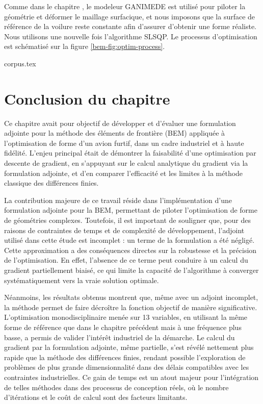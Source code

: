 Comme dans le chapitre \textit{}, le modeleur GANIMEDE \citep{Kleinveld2008} est utilisé pour piloter la géométrie et déformer le maillage surfacique, et nous imposons que la surface de référence de la voilure reste constante afin d'assurer d'obtenir une forme réaliste. Nous utilisons une nouvelle fois l'algorithme SLSQP. Le processus d'optimisation est schématisé sur la figure \ref{bem-fig:optim-process}.



\begin{article}
    {corpus.tex}
\end{article}

\section*{Conclusion du chapitre}
\label{sec:ch3-conclgen}

Ce chapitre avait pour objectif de développer et d'évaluer une formulation adjointe pour la méthode des éléments de frontière (BEM) appliquée à l'optimisation de forme d'un avion furtif, dans un cadre industriel et à haute fidélité. L'enjeu principal était de démontrer la faisabilité d'une optimisation par descente de gradient, en s'appuyant sur le calcul analytique du gradient via la formulation adjointe, et d'en comparer l'efficacité et les limites à la méthode classique des différences finies.

La contribution majeure de ce travail réside dans l'implémentation d'une formulation adjointe pour la BEM, permettant de piloter l'optimisation de forme de géométries complexes. Toutefois, il est important de souligner que, pour des raisons de contraintes de temps et de complexité de développement, l'adjoint utilisé dans cette étude est incomplet : un terme de la formulation a été négligé. Cette approximation a des conséquences directes sur la robustesse et la précision de l'optimisation. En effet, l'absence de ce terme peut conduire à un calcul du gradient partiellement biaisé, ce qui limite la capacité de l'algorithme à converger systématiquement vers la vraie solution optimale.%

Néanmoins, les résultats obtenus montrent que, même avec un adjoint incomplet, la méthode permet de faire décroître la fonction objectif de manière significative. L'optimisation monodisciplinaire menée sur 13 variables, en utilisant la même forme de référence que dans le chapitre précédent mais à une fréquence plus basse, a permis de valider l'intérêt industriel de la démarche. Le calcul du gradient par la formulation adjointe, même partielle, s'est révélé nettement plus rapide que la méthode des différences finies, rendant possible l'exploration de problèmes de plus grande dimensionnalité dans des délais compatibles avec les contraintes industrielles. Ce gain de temps est un atout majeur pour l'intégration de telles méthodes dans des processus de conception réels, où le nombre d'itérations et le coût de calcul sont des facteurs limitants.

